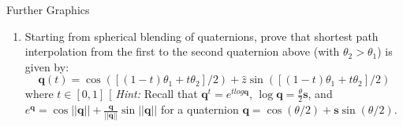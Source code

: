 \documentclass{tripos}  %
\begin{document}
\begin{question}[MockIB,year=2024,paper=1,question=4,author=rrw]{Further Graphics}
\begin{enumerate}
\begin{enumerate}
      \item Starting from spherical blending of quaternions, prove
        that shortest path interpolation from the first to the second
        quaternion above (with $\theta_2 > \theta_1$) is given by:
        \[
        \mathbf{q}(t) = \cos([(1-t)\theta_1 + t\theta_2]/2) + \hat{z}\sin([(1-t)\theta_1  + t\theta_2]/2)
        \]
        where $t \in [0,1]$ [ {\em Hint:} Recall that $\mathbf{q}^t = e^{t log \mathbf{q}}$, $\log \mathbf{q} = \frac{\theta{}}{2}\mathbf{s}$, and $e^{\mathbf{q}} = \cos||\mathbf{q}|| + \frac{\mathbf{q}}{||\mathbf{q}||}\sin ||\mathbf{q}||$ for a quaternion $\mathbf{q} = \cos(\theta / 2) + \mathbf{s}\sin(\theta/2)$.
        \end{enumerate}
    
  \end{enumerate}
  

  
\end{question}
\end{document}
